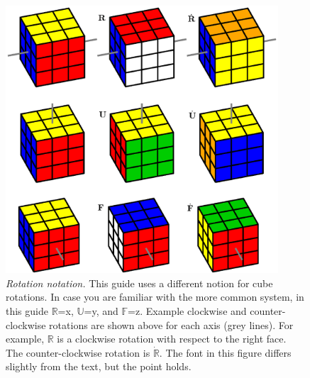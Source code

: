 \documentclass[paper=a4, fontsize=11pt, parskip=full]{scrartcl} %
\newcommand*{\A}{\fontfamily{pcr}\selectfont} %
\newcommand{\2}{\ensuremath{^2}} %
\newcommand*{\R}{$\mathbb{R}$\xspace}
\newcommand*{\Rp}{$\dot{\mathbb{R}}$\xspace}
\newcommand*{\F}{$\mathbb{F}$\xspace}
\newcommand*{\U}{$\mathbb{U}$\xspace}
\begin{document}
\begin{figure}[h]
\centering
\includegraphics[width=4in]{rotationNotation.eps}
\caption{\textit{Rotation notation.} This guide uses a different notion for cube rotations. 
In case you are familiar with the more common system, in this guide \R={\A x}, \U={\A y}, and
\F={\A z}. Example clockwise and counter-clockwise rotations are shown above for each axis (grey lines). For
example, \R is a clockwise rotation with respect to the right face. The counter-clockwise rotation
is \Rp. The font in this figure differs slightly from the text, but the point holds.}
\label{fig:rotationNotation}
\end{figure}

\clearpage
\end{document}
